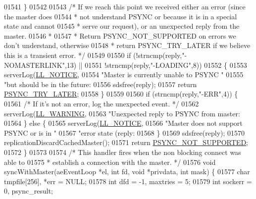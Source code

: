 \begin{DoxyCode}
{{{{{{{{{{{{{{{{{{{{{{{{{{{{{{{{{{{{{{{{{{{{{{{{{{{{{{{01541     \}
01542 
01543     \textcolor{comment}{/* If we reach this point we received either an error (since the master does}
01544 \textcolor{comment}{     * not understand PSYNC or because it is in a special state and cannot}
01545 \textcolor{comment}{     * serve our request), or an unexpected reply from the master.}
01546 \textcolor{comment}{     *}
01547 \textcolor{comment}{     * Return PSYNC\_NOT\_SUPPORTED on errors we don't understand, otherwise}
01548 \textcolor{comment}{     * return PSYNC\_TRY\_LATER if we believe this is a transient error. */}
01549 
01550     \textcolor{keywordflow}{if} (!strncmp(reply,\textcolor{stringliteral}{"-NOMASTERLINK"},13) ||
01551         !strncmp(reply,\textcolor{stringliteral}{"-LOADING"},8))
01552     \{
01553         serverLog(\hyperlink{server_8h_a8c54c191e436c7dd3012167212692401}{LL\_NOTICE},
01554             \textcolor{stringliteral}{"Master is currently unable to PSYNC "}
01555             \textcolor{stringliteral}{"but should be in the future: %
01556         sdsfree(reply);
01557         \textcolor{keywordflow}{return} \hyperlink{replication_8c_a033726631820c6ebdfb2f034a870e9da}{PSYNC\_TRY\_LATER};
01558     \}
01559 
01560     \textcolor{keywordflow}{if} (strncmp(reply,\textcolor{stringliteral}{"-ERR"},4)) \{
01561         \textcolor{comment}{/* If it's not an error, log the unexpected event. */}
01562         serverLog(\hyperlink{server_8h_a31229b9334bba7d6be2a72970967a14b}{LL\_WARNING},
01563             \textcolor{stringliteral}{"Unexpected reply to PSYNC from master: %
01564     \} \textcolor{keywordflow}{else} \{
01565         serverLog(\hyperlink{server_8h_a8c54c191e436c7dd3012167212692401}{LL\_NOTICE},
01566             \textcolor{stringliteral}{"Master does not support PSYNC or is in "}
01567             \textcolor{stringliteral}{"error state (reply: %
01568     \}
01569     sdsfree(reply);
01570     replicationDiscardCachedMaster();
01571     \textcolor{keywordflow}{return} \hyperlink{replication_8c_a9722855166099ab95f712e73ed819abf}{PSYNC\_NOT\_SUPPORTED};
01572 \}
01573 
01574 \textcolor{comment}{/* This handler fires when the non blocking connect was able to}
01575 \textcolor{comment}{ * establish a connection with the master. */}
01576 \textcolor{keywordtype}{void} syncWithMaster(aeEventLoop *el, \textcolor{keywordtype}{int} fd, \textcolor{keywordtype}{void} *privdata, \textcolor{keywordtype}{int} mask) \{
01577     \textcolor{keywordtype}{char} tmpfile[256], *err = NULL;
01578     \textcolor{keywordtype}{int} dfd = -1, maxtries = 5;
01579     \textcolor{keywordtype}{int} sockerr = 0, psync\_result;
}}}}}}}}}}}}}}}}}}}}}}}}}}}}}}}}}}}}}}}}}}}}}}}}}}}}}}}}}}
\end{DoxyCode}
